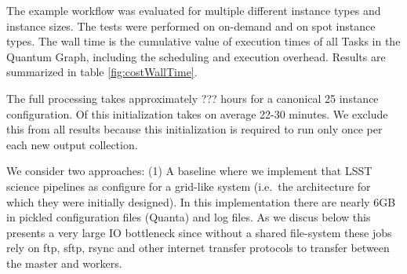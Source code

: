 \documentclass[a4paper, 10pt, conference]{ieeeconf}
\begin{document}
The example workflow was evaluated for multiple different instance types and instance sizes. The tests were performed on on-demand and on spot instance types. The wall time is the cumulative value of execution times of all Tasks in the Quantum Graph, including the scheduling and execution overhead. Results are summarized in table \ref{fig:costWallTime}.  

The full processing takes approximately ??? hours for a canonical 25 instance configuration. Of this  
initialization  takes on average 22-30 minutes. We exclude this from all results because this initialization is required to run only once per each new output collection.


We consider two approaches: (1) A baseline where we implement that LSST science pipelines as configure for a grid-like system (i.e.\ the architecture for which they were initially designed). In this implementation there are nearly 6GB in pickled configuration files (Quanta) and log files. As we discus below this presents a very large IO bottleneck since without a shared file-system these jobs rely on ftp, sftp, rsync and other internet transfer protocols to transfer between the master and workers.

\end{document}
